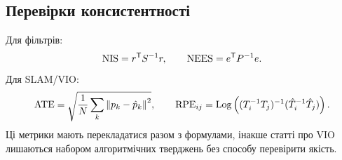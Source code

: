\subsection{Перевірки консистентності}

Для фільтрів:
\begin{equation}
 \mathrm{NIS}=r^{\mathsf T} S^{-1}r,
 \qquad
 \mathrm{NEES}=e^{\mathsf T} P^{-1}e.
\end{equation}
Для SLAM/VIO:
\begin{equation}
 \mathrm{ATE}=\sqrt{\frac1N\sum_k\left\lVert p_k-\hat p_k\right\rVert^2},
 \qquad
 \mathrm{RPE}_{ij}=\mathrm{Log}\left((T_i^{-1}T_j)^{-1}(\hat T_i^{-1}\hat T_j)\right).
\end{equation}
Ці метрики мають перекладатися разом з формулами, інакше статті про VIO лишаються набором алгоритмічних тверджень без способу перевірити якість.

